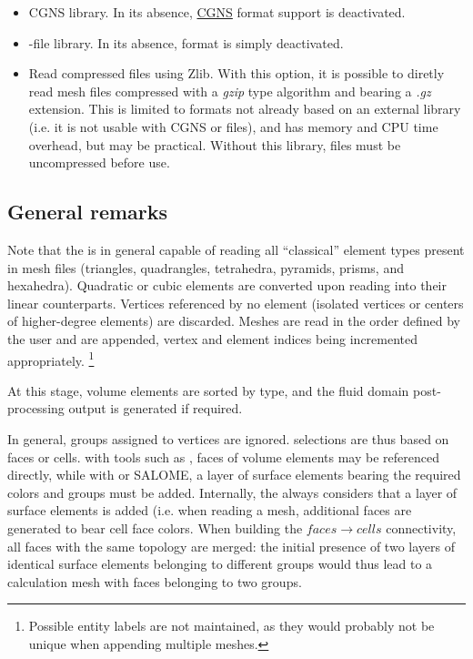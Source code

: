 {{{\begin{itemize}

\item CGNS library. In its absence, \hyperref[fmtdesc:cgns]{CGNS}
      format support is deactivated.

\item \med-file library. In its absence, \hyperref[fmtdesc:med]{\med}
      format is simply deactivated.

\item Read compressed files using Zlib. With this option, it is
      possible to diretly read mesh files compressed with a
      \emph{gzip} type algorithm and bearing a \emph{.gz} extension.
      This is limited to formats not already based on an external
      library (i.e. it is not usable with CGNS or \med files),
      and has memory and CPU time overhead, but may be practical.
      Without this library, files must be uncompressed before use.

\end{itemize}

\subsection{General remarks}

Note that the \pcs is in general capable of reading all ``classical''
element types present in mesh files (triangles, quadrangles, tetrahedra,
pyramids, prisms, and hexahedra).
Quadratic or cubic elements are converted upon reading into their
linear counterparts. Vertices referenced by no element (isolated vertices
or centers of higher-degree elements) are discarded. Meshes are read
in the order defined by the user and are appended, vertex and element
indices being incremented appropriately.
\footnote{Possible entity labels are not maintained, as they would
probably not be unique when appending multiple meshes.}

At this stage, volume elements are sorted by type, and the fluid domain
post-processing output is generated if required.

In general, groups assigned to vertices are ignored.
selections are thus based on faces or cells. with tools such
as \simail, faces of volume elements may be referenced directly, while
with \ideas or SALOME, a layer of surface elements bearing the required
colors and groups must be added. Internally, the \pcs always considers
that a layer of surface elements is added (i.e. when reading a \simail
mesh, additional faces are generated to bear cell face colors.
When building the $faces \rightarrow cells$ connectivity, all faces with the
same topology are merged: the initial presence of two layers of identical
surface elements belonging to different groups would thus lead to
a calculation mesh with faces belonging to two groups.

}}}
